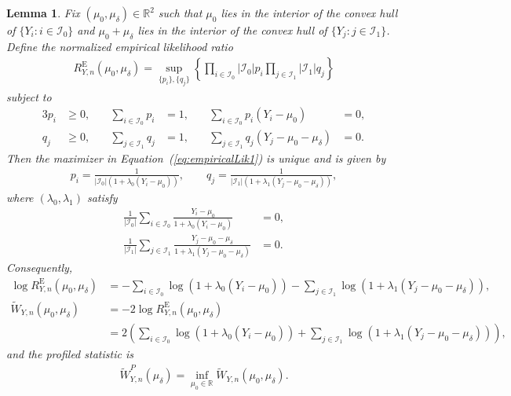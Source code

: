 \documentclass[11pt]{article}
\newtheorem{lemma}[proposition]{Lemma}
\begin{document}
\begin{lemma}\label{lem:empirical-likelihood-derivation}
Fix $(\mu_0,\mu_\delta) \in \mathbb{R}^2$ such that $\mu_0$ lies in the interior of the convex hull of $\{Y_i : i \in \mathcal{I}_0\}$ and $\mu_0 + \mu_\delta$ lies in the interior of the convex hull of $\{Y_j : j \in \mathcal{I}_1\}$. Define the normalized empirical likelihood ratio
\begin{align}
  R_{Y,n}^{\mathrm{E}}(\mu_0,\mu_\delta)
  = \sup_{\{p_i\},\{q_j\}}
  \left\{
    \prod_{i \in \mathcal{I}_0} |\mathcal{I}_0|p_i
    \prod_{j \in \mathcal{I}_1} |\mathcal{I}_1|q_j
  \right\}\label{eq:empiricalLik1}
\end{align}
subject to
\begin{alignat*}{3}
  p_i &\geq 0, &\quad \sum_{i \in \mathcal{I}_0} p_i &= 1, &\quad \sum_{i \in \mathcal{I}_0} p_i(Y_i - \mu_0) &= 0,\\
  q_j &\geq 0, &\quad \sum_{j \in \mathcal{I}_1} q_j &= 1, &\quad \sum_{j \in \mathcal{I}_1} q_j(Y_j - \mu_0 - \mu_\delta) &= 0.
\end{alignat*}
Then the maximizer in Equation~(\ref{eq:empiricalLik1}) is unique and is given by
\begin{align*}
  p_i = \frac{1}{|\mathcal{I}_0|\left(1 + \lambda_0(Y_i - \mu_0)\right)},
  \qquad
  q_j = \frac{1}{|\mathcal{I}_1|\left(1 + \lambda_1(Y_j - \mu_0 - \mu_\delta)\right)},
\end{align*}
where $(\lambda_0,\lambda_1)$ satisfy
\begin{align*}
  \frac{1}{|\mathcal{I}_0|}\sum_{i \in \mathcal{I}_0}
  \frac{Y_i - \mu_0}{1 + \lambda_0(Y_i - \mu_0)} &= 0,\\
  \frac{1}{|\mathcal{I}_1|}\sum_{j \in \mathcal{I}_1}
  \frac{Y_j - \mu_0 - \mu_\delta}{1 + \lambda_1(Y_j - \mu_0 - \mu_\delta)} &= 0.
\end{align*}
Consequently,
\begin{align*}
  \log R_{Y,n}^{\mathrm{E}}(\mu_0,\mu_\delta)
  &= -\sum_{i \in \mathcal{I}_0}\log\left(1 + \lambda_0(Y_i - \mu_0)\right)
     - \sum_{j \in \mathcal{I}_1}\log\left(1 + \lambda_1(Y_j - \mu_0 - \mu_\delta)\right),\\
  \widetilde{W}_{Y,n}(\mu_0,\mu_\delta)
  &= -2\log R_{Y,n}^{\mathrm{E}}(\mu_0,\mu_\delta)\\
  &= 2\left(
      \sum_{i \in \mathcal{I}_0}\log\left(1 + \lambda_0(Y_i - \mu_0)\right)
      + \sum_{j \in \mathcal{I}_1}\log\left(1 + \lambda_1(Y_j - \mu_0 - \mu_\delta)\right)
    \right),
\end{align*}
and the profiled statistic is
\begin{align*}
  \widetilde{W}_{Y,n}^P(\mu_\delta) = \inf_{\mu_0 \in \mathbb{R}} \widetilde{W}_{Y,n}(\mu_0,\mu_\delta).
\end{align*}
\end{lemma}
\end{document}

